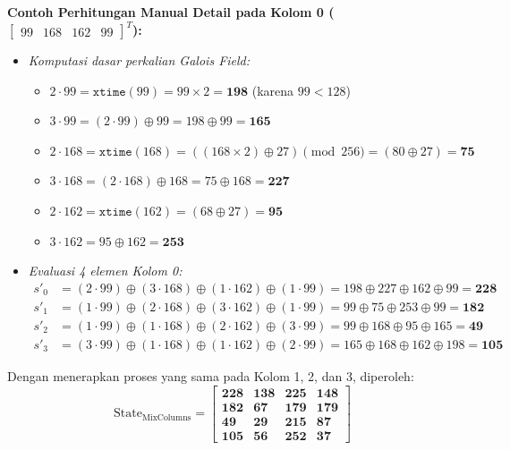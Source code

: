 \documentclass[11pt,a4paper]{article}
\begin{document}
\textbf{Contoh Perhitungan Manual Detail pada Kolom 0 ($\begin{bmatrix} 99 & 168 & 162 & 99 \end{bmatrix}^T$):}
\begin{itemize}[leftmargin=*]
    \item \textit{Komputasi dasar perkalian Galois Field:}
    \begin{itemize}
        \item $2 \cdot 99 = \mathtt{xtime}(99) = 99 \times 2 = \mathbf{198}$ (karena $99 < 128$)
        \item $3 \cdot 99 = (2 \cdot 99) \oplus 99 = 198 \oplus 99 = \mathbf{165}$
        \item $2 \cdot 168 = \mathtt{xtime}(168) = ((168 \times 2) \oplus 27) \pmod{256} = (80 \oplus 27) = \mathbf{75}$
        \item $3 \cdot 168 = (2 \cdot 168) \oplus 168 = 75 \oplus 168 = \mathbf{227}$
        \item $2 \cdot 162 = \mathtt{xtime}(162) = (68 \oplus 27) = \mathbf{95}$
        \item $3 \cdot 162 = 95 \oplus 162 = \mathbf{253}$
    \end{itemize}
    \item \textit{Evaluasi 4 elemen Kolom 0:}
    \begin{align*}
    s'_0 &= (2 \cdot 99) \oplus (3 \cdot 168) \oplus (1 \cdot 162) \oplus (1 \cdot 99) = 198 \oplus 227 \oplus 162 \oplus 99 = \mathbf{228} \\
    s'_1 &= (1 \cdot 99) \oplus (2 \cdot 168) \oplus (3 \cdot 162) \oplus (1 \cdot 99) = 99 \oplus 75 \oplus 253 \oplus 99 = \mathbf{182} \\
    s'_2 &= (1 \cdot 99) \oplus (1 \cdot 168) \oplus (2 \cdot 162) \oplus (3 \cdot 99) = 99 \oplus 168 \oplus 95 \oplus 165 = \mathbf{49} \\
    s'_3 &= (3 \cdot 99) \oplus (1 \cdot 168) \oplus (1 \cdot 162) \oplus (2 \cdot 99) = 165 \oplus 168 \oplus 162 \oplus 198 = \mathbf{105}
    \end{align*}
\end{itemize}

Dengan menerapkan proses yang sama pada Kolom 1, 2, dan 3, diperoleh:
\begin{equation*}
\text{State}_{\text{MixColumns}} = \mathbf{\begin{bmatrix}
228 & 138 & 225 & 148 \\
182 & 67  & 179 & 179 \\
49  & 29  & 215 & 87 \\
105 & 56  & 252 & 37
\end{bmatrix}}
\end{equation*}
\end{document}
